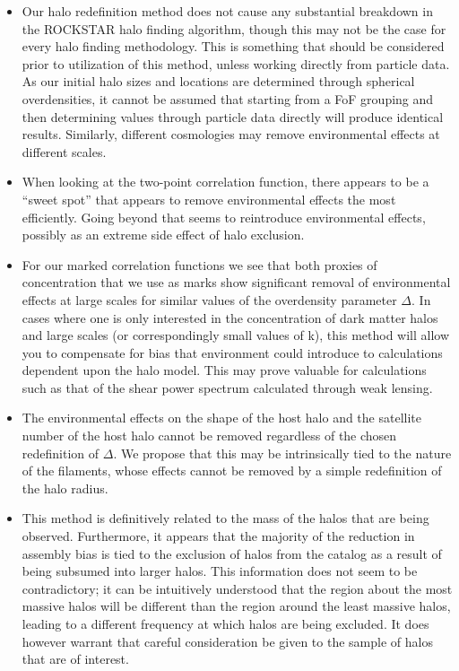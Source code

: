 \documentclass[usenatbib,usegraphicx,letterpaper]{mn2e}
\begin{document}
\begin{itemize}
	\item Our halo redefinition method does not cause any substantial breakdown in the ROCKSTAR halo finding algorithm, though this may not be the case for every halo finding methodology. This is something that should be considered prior to utilization of this method, unless working directly from particle data. As our initial halo sizes and locations are determined through spherical overdensities, it cannot be assumed that starting from a FoF grouping and then determining values through particle data directly will produce identical results. Similarly, different cosmologies may remove environmental effects at different scales.

	\item When looking at the two-point correlation function, there appears to be a ``sweet spot'' that appears to remove environmental effects the most efficiently. Going beyond that seems to reintroduce environmental effects, possibly as an extreme side effect of halo exclusion.

	\item For our marked correlation functions we see that both proxies of concentration that we use as marks show significant removal of environmental effects at large scales for similar values of the overdensity parameter $\Delta$. In cases where one is only interested in the concentration of dark matter halos and large scales (or correspondingly small values of k), this method will allow you to compensate for bias that environment could introduce to calculations dependent upon the halo model. This may prove valuable for calculations such as that of the shear power spectrum calculated through weak lensing.

	\item The environmental effects on the shape of the host halo and the satellite number of the host halo cannot be removed regardless of the chosen redefinition of $\Delta$. We propose that this may be intrinsically tied to the nature of the filaments, whose effects cannot be removed by a simple redefinition of the halo radius.

	\item This method is definitively related to the mass of the halos that are being observed. Furthermore, it appears that the majority of the reduction in assembly bias is tied to the exclusion of halos from the catalog as a result of being subsumed into larger halos. This information does not seem to be contradictory; it can be intuitively understood that the region about the most massive halos will be different than the region around the least massive halos, leading to a different frequency at which halos are being excluded. It does however warrant that careful consideration be given to the sample of halos that are of interest.
\end{itemize}
\end{document}

